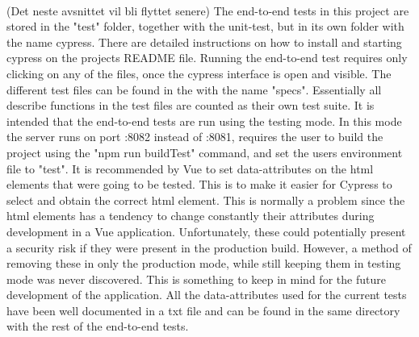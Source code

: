 \\[11pt]
(Det neste avsnittet vil bli flyttet senere)
The end-to-end tests in this project are stored in the "test" folder, together with the unit-test, but in its own folder with the name cypress. There are detailed instructions on how to install and starting cypress on the projects README file. Running the end-to-end test requires only clicking on any of the files, once the cypress interface is open and visible. The different test files can be found in the with the name "specs". Essentially all describe functions in the test files are counted as their own test suite. It is intended that the end-to-end tests are run using the testing mode. In this mode the server runs on port :8082 instead of :8081, requires the user to build the project using the "npm run buildTest" command, and set the users environment file to "test". It is recommended by Vue to set data-attributes on the html elements that were going to be tested. This is to make it easier for Cypress to select and obtain the correct html element. This is normally a problem since the html elements has a tendency to change constantly their attributes during development in a Vue application. Unfortunately, these could potentially present a security risk if they were present in the production build. However, a method of removing these in only the production mode, while still keeping them in testing mode was never discovered. This is something to keep in mind for the future development of the application. All the data-attributes used for the current tests have been well documented in a txt file and can be found in the same directory with the rest of the end-to-end tests.\cite{Cypress:BestPractise}
